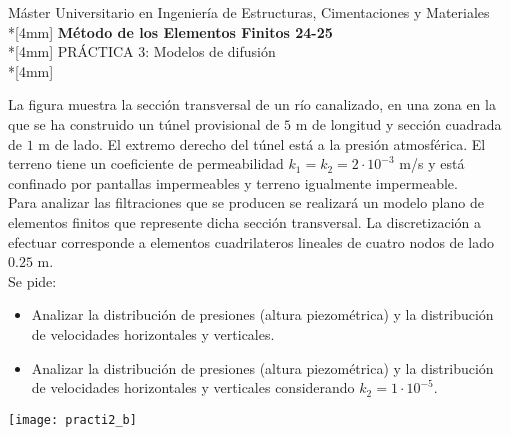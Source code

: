 \documentclass[a4paper,12pt]{article}
\begin{document}
\mbox{}\vspace*{-45mm}

{\centering
{\small\sc 
Máster Universitario en Ingeniería de Estructuras, Cimentaciones y Materiales}\\*[4mm]
{\Large\bf Método de los Elementos Finitos 24-25}\\*[4mm]
PRÁCTICA 3: Modelos de difusión \\*[4mm]
}

\vspace{3mm}

\noindent
La figura muestra la sección transversal de un río canalizado, en una zona en la que se ha construido un túnel provisional de $5$ m de longitud y sección cuadrada de $1$ m de lado. El extremo derecho del túnel está a la presión atmosférica. El terreno tiene un coeficiente de permeabilidad $k_1=k_2=2\cdot10^{-3}$ m/s y está confinado por pantallas impermeables y terreno igualmente impermeable.\\

Para analizar las filtraciones que se producen se realizará un modelo plano de elementos finitos que represente dicha sección transversal. La discretización a efectuar corresponde a elementos cuadrilateros lineales de cuatro
nodos de lado $0.25$ m.\\

Se pide:

\begin{itemize}
\item Analizar la distribución de presiones (altura piezométrica) y la distribución de velocidades horizontales y verticales.
\item Analizar la distribución de presiones (altura piezométrica) y la distribución de velocidades horizontales y verticales considerando $k_2=1\cdot 10^{-5}$.
\end{itemize}



\begin{center}
\texttt{[image: practi2\_b]}
\end{center}
\end{document}
